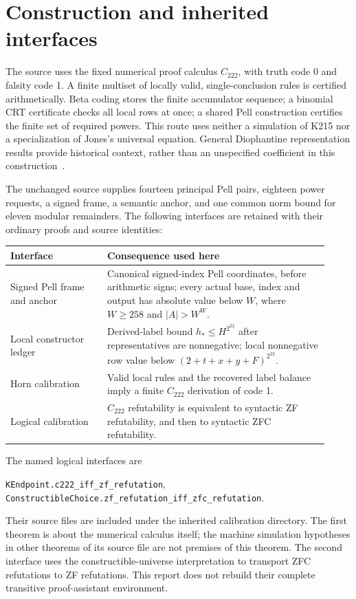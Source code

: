 \documentclass[11pt]{article}
\begin{document}
\section{Construction and inherited interfaces}\label{sec:interfaces}

The source uses the fixed numerical proof calculus $C_{222}$, with truth
code 0 and falsity code 1. A finite multiset of locally valid, single-conclusion
rules is certified arithmetically. Beta coding stores the finite accumulator
sequence; a binomial CRT certificate checks all local rows at once; a shared
Pell construction certifies the finite set of required powers. This route
uses neither a simulation of K215 nor a specialization of Jones's universal
equation. General Diophantine representation results provide historical
context, rather than an unspecified coefficient in this construction~\cite{jones}.

The unchanged source supplies fourteen principal Pell pairs, eighteen
power requests, a signed frame, a semantic anchor, and one common norm
bound for eleven modular remainders. The following interfaces are retained
with their ordinary proofs and source identities:

\begin{center}\small
\begin{tabular}{p{0.28\linewidth}p{0.64\linewidth}}
\toprule
Interface & Consequence used here\\
\midrule
Signed Pell frame and anchor & Canonical signed-index Pell coordinates,
before arithmetic signs; every actual base, index and output has absolute
value below $W$, where $W\ge258$ and $|A|>W^W$.\\
Local constructor ledger & Derived-label bound $h_*\le H^{2^{22}}$ after
representatives are nonnegative; local nonnegative row value below
$(2+t+x+y+F)^{2^{23}}$.\\
Horn calibration & Valid local rules and the recovered label balance imply
a finite $C_{222}$ derivation of code 1.\\
Logical calibration & $C_{222}$ refutability is equivalent to syntactic ZF
refutability, and then to syntactic ZFC refutability.\\
\bottomrule
\end{tabular}
\end{center}

The named logical interfaces are
\begin{center}\small
\nolinkurl{KEndpoint.c222_iff_zf_refutation},\\
\nolinkurl{ConstructibleChoice.zf_refutation_iff_zfc_refutation}.
\end{center}
Their source files are included under the inherited calibration directory.
The first theorem is about the numerical calculus itself; the machine
simulation hypotheses in other theorems of its source file are not premises
of this theorem. The second interface uses the constructible-universe
interpretation to transport ZFC refutations to ZF refutations. This report
does not rebuild their complete transitive proof-assistant environment.
\end{document}
